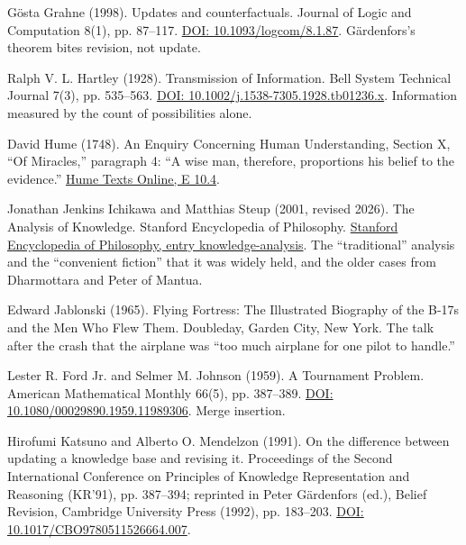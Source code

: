 \documentclass[11pt,twoside]{article}
\theoremstyle{thielethm}
\theoremstyle{thieledef}
\theoremstyle{thieledef}
\theoremstyle{thieledef}
\theoremstyle{thielethm}
\theoremstyle{thieleobs}
\theoremstyle{thielethm}
\begin{document}
\noindent G\"osta Grahne (1998). Updates and counterfactuals. Journal of Logic and Computation 8(1), pp. 87--117. \href{https://doi.org/10.1093/logcom/8.1.87}{DOI: 10.1093/logcom/8.1.87}. G\"ardenfors's theorem bites revision, not update.
\par\medskip

\noindent Ralph V. L. Hartley (1928). Transmission of Information. Bell System Technical Journal 7(3), pp. 535--563. \href{https://doi.org/10.1002/j.1538-7305.1928.tb01236.x}{DOI: 10.1002/j.1538-7305.1928.tb01236.x}. Information measured by the count of possibilities alone.
\par\medskip

\noindent David Hume (1748). An Enquiry Concerning Human Understanding, Section X, ``Of Miracles,'' paragraph 4: ``A wise man, therefore, proportions his belief to the evidence.'' \href{https://davidhume.org/texts/e/10}{Hume Texts Online, E 10.4}.
\par\medskip

\noindent Jonathan Jenkins Ichikawa and Matthias Steup (2001, revised 2026). The Analysis of Knowledge. Stanford Encyclopedia of Philosophy. \href{https://plato.stanford.edu/entries/knowledge-analysis/}{Stanford Encyclopedia of Philosophy, entry knowledge-analysis}. The ``traditional'' analysis and the ``convenient fiction'' that it was widely held, and the older cases from Dharmottara and Peter of Mantua.
\par\medskip

\noindent Edward Jablonski (1965). Flying Fortress: The Illustrated Biography of the B-17s and the Men Who Flew Them. Doubleday, Garden City, New York. The talk after the crash that the airplane was ``too much airplane for one pilot to handle.''
\par\medskip

\noindent Lester R. Ford Jr. and Selmer M. Johnson (1959). A Tournament Problem. American Mathematical Monthly 66(5), pp. 387--389. \href{https://doi.org/10.1080/00029890.1959.11989306}{DOI: 10.1080/00029890.1959.11989306}. Merge insertion.
\par\medskip

\noindent Hirofumi Katsuno and Alberto O. Mendelzon (1991). On the difference between updating a knowledge base and revising it. Proceedings of the Second International Conference on Principles of Knowledge Representation and Reasoning (KR'91), pp. 387--394; reprinted in Peter G\"ardenfors (ed.), Belief Revision, Cambridge University Press (1992), pp. 183--203. \href{https://doi.org/10.1017/CBO9780511526664.007}{DOI: 10.1017/CBO9780511526664.007}.
\par\medskip
\end{document}
